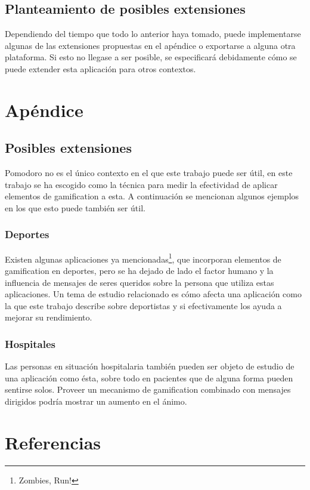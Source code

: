 \documentclass[12pt,letterpaper]{report}
\begin{document}
\hypertarget{planteamiento-de-posibles-extensiones}{%
\subsection{Planteamiento de posibles
extensiones}\label{planteamiento-de-posibles-extensiones}}

Dependiendo del tiempo que todo lo anterior haya tomado, puede
implementarse algunas de las extensiones propuestas en el apéndice o
exportarse a alguna otra plataforma. Si esto no llegase a ser posible,
se especificará debidamente cómo se puede extender esta aplicación para
otros contextos.

\newpage
\section{Apéndice}
\label{sec:apendice}

\subsection{Posibles extensiones}
\label{subsec:posibles-extensiones}

Pomodoro no es el único contexto en el que este trabajo puede ser
útil, en este trabajo se ha escogido como la técnica para medir la
efectividad de aplicar elementos de gamification a esta. A
continuación se mencionan algunos ejemplos en los que esto puede
también ser útil.

\subsubsection{Deportes}

Existen algunas aplicaciones ya mencionadas\footnote{Zombies, Run!},
que incorporan elementos de gamification en deportes, pero se ha
dejado de lado el factor humano y la influencia de mensajes de seres
queridos sobre la persona que utiliza estas aplicaciones. Un tema de
estudio relacionado es cómo afecta una aplicación como la que este
trabajo describe sobre deportistas y si efectivamente los ayuda a
mejorar su rendimiento.

\subsubsection{Hospitales}

Las personas en situación hospitalaria también pueden ser objeto de
estudio de una aplicación como ésta, sobre todo en pacientes que de
alguna forma pueden sentirse solos. Proveer un mecanismo de
gamification combinado con mensajes dirigidos podría mostrar un
aumento en el ánimo.

\newpage
\section{Referencias}
\printbibliography[heading=none]
\end{document}
